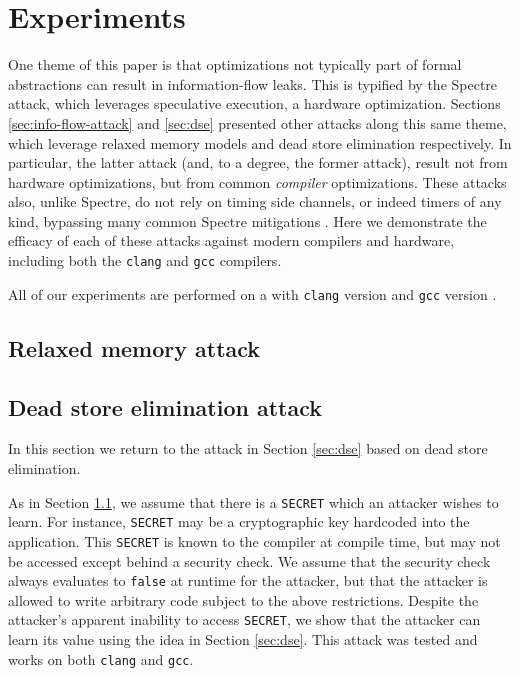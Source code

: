 \section{Experiments}
\label{sec:experiments}

One theme of this paper is that optimizations not typically part of formal
abstractions can result in information-flow leaks.
This is typified by the Spectre attack, which leverages speculative execution,
a hardware optimization.
Sections \ref{sec:info-flow-attack} and \ref{sec:dse} presented other attacks
along this same theme, which leverage relaxed memory models and dead store
elimination respectively.
In particular, the latter attack (and, to a degree, the former attack), result
not from hardware optimizations, but from common \emph{compiler} optimizations.
These attacks also, unlike Spectre, do not rely on timing side channels, or
indeed timers of any kind, bypassing many common Spectre mitigations
\cite{TODO}.
Here we demonstrate the efficacy of each of these attacks against modern
compilers and hardware, including both the \verb|clang| and \verb|gcc|
compilers.

All of our experiments are performed on a  with
\verb|clang| version  and \verb|gcc| version .

\subsection{Relaxed memory attack}
\label{subsec:exp-rel-mem}

\subsection{Dead store elimination attack}
In this section we return to the attack in Section \ref{sec:dse} based on
dead store elimination.

As in Section \ref{subsec:exp-rel-mem}, we assume that there is a
\verb|SECRET| which an attacker wishes to learn.
For instance, \verb|SECRET| may be a cryptographic key hardcoded into the
application.
This \verb|SECRET| is known to the compiler at compile time, but may not be
accessed except behind a security check.
We assume that the security check always evaluates to \verb|false| at runtime
for the attacker, but that the attacker is allowed to write arbitrary code
subject to the above restrictions.
Despite the attacker's apparent inability to access \verb|SECRET|, we show
that the attacker can learn its value using the idea in Section \ref{sec:dse}.
This attack was tested and works on both \verb|clang| and \verb|gcc|.


